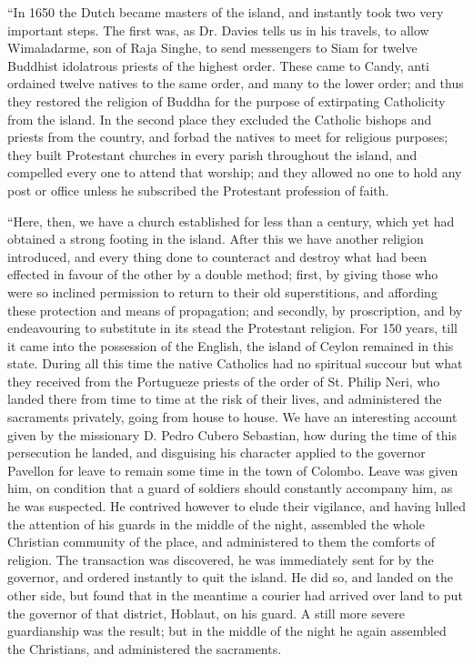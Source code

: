 ``In
1650 the Dutch became masters of the island, and instantly took two very
important steps. The first was, as Dr. Davies tells us in his travels,
to allow Wimaladarme, son of Raja Singhe, to send messengers to Siam for
twelve Buddhist idolatrous priests of the highest order. These came to
Candy, anti ordained twelve natives to the same order, and many to the
lower order; and thus they restored the religion of Buddha for the
purpose of extirpating Catholicity from the island. In the second place
they excluded the Catholic bishops and priests from the country, and
forbad the natives to meet for religious purposes; they built Protestant
churches in every parish throughout the island, and compelled every one
to attend that worship; and they allowed no one to hold any post or
office unless he subscribed the Protestant profession of faith.

``Here,
then, we have a church established for less than a century, which yet
had obtained a strong footing in the island. After this we
have another religion introduced, and every thing done to counteract and
destroy what had been effected in favour of the other by a double
method; first, by giving those who were so inclined permission to return
to their old superstitions, and affording these protection and means of
propagation; and secondly, by proscription, and by endeavouring to
substitute in its stead the Protestant religion. For 150 years, till it
came into the possession of the English, the island of Ceylon remained
in this state. During all this time the native Catholics had no
spiritual succour but what they received from the Portugueze priests of
the order of St. Philip Neri, who landed there from time to time at the
risk of their lives, and administered the sacraments privately, going
from house to house. We have an interesting account given by the
missionary D. Pedro Cubero Sebastian, how during the time of this
persecution he landed, and disguising his character applied to the
governor Pavellon for leave to remain some time in the town of Colombo.
Leave was given him, on condition that a guard of soldiers should
constantly accompany him, as he was suspected. He contrived however to
elude their vigilance, and having lulled the attention of his guards in
the middle of the night, assembled the whole Christian community of the
place, and administered to them the comforts of religion. The
transaction was discovered, he was immediately sent for by the governor,
and ordered instantly to quit the island. He did so, and landed on the
other side, but found that in the meantime a courier had arrived over
land to put the governor of that district, Hoblaut, on his guard. A
still more severe guardianship was the result; but in the middle of the
night he again assembled the Christians, and administered the
sacraments.

